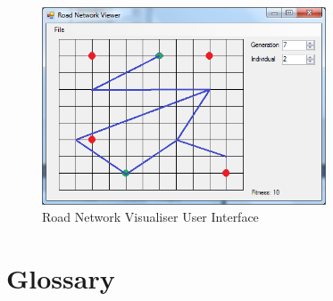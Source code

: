 \begin{figure}[ht!]
 \caption{Road Network Visualiser User Interface}
 \centering
 \includegraphics[width=0.75\textwidth]{../Visualiser.png}
\end{figure}

\clearpage

\section{Glossary}


